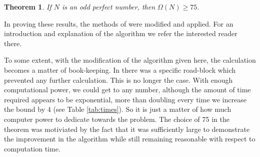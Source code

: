 \documentclass{article}
\newtheorem{thm}{Theorem}[section]
\begin{document}
\begin{thm} If $N$ is an odd perfect number, then $\Omega(N) \geq 75$. 
\label{thm:main}
\end{thm}

In proving these results, the methods of \cite{Hare05a} were modified and 
    applied.  
For an introduction and explanation of the algorithm we refer the 
    interested reader there.

To some extent, with the modification of the algorithm given here, 
    the calculation becomes a matter of book-keeping.
In \cite{Hare05a} there was a specific road-block which prevented any
    further calculation. 
This is no longer the case.  
With enough computational power, we could get to any number, although the
    amount of time required appears to be exponential, more than 
    doubling every time we increase the bound by 4 (see Table \ref{tab:times}).
So it is just a matter of how much computer power to dedicate 
    towards the problem.
The choice of 75 in the theorem was motiviated by the fact that 
    it was sufficiently large to demonstrate 
    the improvement in the algorithm while still remaining reasonable 
    with respect to computation time.
\end{document}
